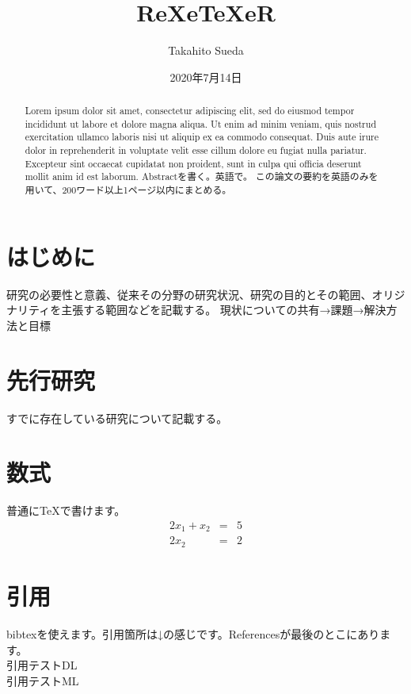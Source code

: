 \documentclass[a4paper]{article} %
\title{ReXeTeXeR}
\author{Takahito Sueda}
\date{2020年7月14日}
\begin{document}
  \maketitle

  \begin{abstract}
    Lorem ipsum dolor sit amet, consectetur adipiscing elit, sed do eiusmod tempor incididunt ut labore et dolore magna aliqua. Ut enim ad minim veniam, quis nostrud exercitation ullamco laboris nisi ut aliquip ex ea commodo consequat. Duis aute irure dolor in reprehenderit in voluptate velit esse cillum dolore eu fugiat nulla pariatur. Excepteur sint occaecat cupidatat non proident, sunt in culpa qui officia deserunt mollit anim id est laborum.
    Abstractを書く。英語で。
    この論文の要約を英語のみを用いて、200ワード以上1ページ以内にまとめる。
  \end{abstract}

  \tableofcontents

  \section{はじめに} %
  \label{sec1}
  研究の必要性と意義、従来その分野の研究状況、研究の目的とその範囲、オリジナリティを主張する範囲などを記載する。
  現状についての共有→課題→解決方法と目標

  \section{先行研究} %
  すでに存在している研究について記載する。

  \section{数式}
  普通に{\TeX}で書けます。
  \begin{eqnarray}
    2x_1 + x_2 & = & 5 \\
    2x_2 & = & 2
  \end{eqnarray}

  \section{引用}
  bibtexを使えます。引用箇所は↓の感じです。Referencesが最後のとこにあります。\\
  引用テストDL\cite{lecun2015deep} \\
  引用テストML\cite{michie1994machine}
\end{document}
